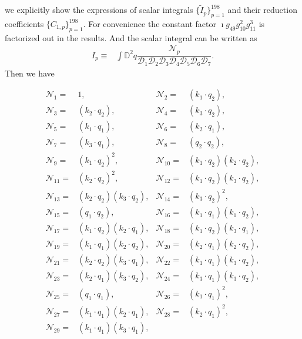\documentclass[twocolumn,aps,showpacs,nofootinbib,superscriptaddress,prd]{revtex4-2}
\begin{document}
we explicitly show the expressions of scalar integrals $\{\widetilde I_{p}\}_{p=1}^{198}$ and their reduction coefficients $\{C_{1,p}\}_{p=1}^{198}$.
For convenience the constant factor $\imath g_{49}g_{10}^2g_{11}^3$
is factorized out in the results. And the scalar integral can be written as
\begin{align}
I_{p}\equiv&\int {\mathbb D}^2 q\dfrac{{\mathcal N}_p}{{\mathcal D}_1{\mathcal D}_2{\mathcal D}_3{\mathcal D}_4{\mathcal D}_5{\mathcal D}_6{\mathcal D}_7}.
\end{align}
Then we have
\begin{widetext}
\begin{align}
{\mathcal N}_{1}=&1,&
{\mathcal N}_{2}=&(k_1\cdot q_2),\nonumber\\
{\mathcal N}_{3}=&(k_2\cdot q_2),&
{\mathcal N}_{4}=&(k_3\cdot q_2),\nonumber\\
{\mathcal N}_{5}=&(k_1\cdot q_1),&
{\mathcal N}_{6}=&(k_2\cdot q_1),\nonumber\\
{\mathcal N}_{7}=&(k_3\cdot q_1),&
{\mathcal N}_{8}=&(q_2\cdot q_2),\nonumber\\
{\mathcal N}_{9}=&(k_1\cdot q_2)^2,&
{\mathcal N}_{10}=&(k_1\cdot q_2) (k_2\cdot q_2),\nonumber\\
{\mathcal N}_{11}=&(k_2\cdot q_2)^2,&
{\mathcal N}_{12}=&(k_1\cdot q_2) (k_3\cdot q_2),\nonumber\\
{\mathcal N}_{13}=&(k_2\cdot q_2) (k_3\cdot q_2),&
{\mathcal N}_{14}=&(k_3\cdot q_2)^2,\nonumber\\
{\mathcal N}_{15}=&(q_1\cdot q_2),&
{\mathcal N}_{16}=&(k_1\cdot q_1) (k_1\cdot q_2),\nonumber\\
{\mathcal N}_{17}=&(k_1\cdot q_2) (k_2\cdot q_1),&
{\mathcal N}_{18}=&(k_1\cdot q_2) (k_3\cdot q_1),\nonumber\\
{\mathcal N}_{19}=&(k_1\cdot q_1) (k_2\cdot q_2),&
{\mathcal N}_{20}=&(k_2\cdot q_1) (k_2\cdot q_2),\nonumber\\
{\mathcal N}_{21}=&(k_2\cdot q_2) (k_3\cdot q_1),&
{\mathcal N}_{22}=&(k_1\cdot q_1) (k_3\cdot q_2),\nonumber\\
{\mathcal N}_{23}=&(k_2\cdot q_1) (k_3\cdot q_2),&
{\mathcal N}_{24}=&(k_3\cdot q_1) (k_3\cdot q_2),\nonumber\\
{\mathcal N}_{25}=&(q_1\cdot q_1),&
{\mathcal N}_{26}=&(k_1\cdot q_1)^2,\nonumber\\
{\mathcal N}_{27}=&(k_1\cdot q_1) (k_2\cdot q_1),&
{\mathcal N}_{28}=&(k_2\cdot q_1)^2,\nonumber\\
{\mathcal N}_{29}=&(k_1\cdot q_1) (k_3\cdot q_1),&

\end{align}
\end{widetext}
\end{document}
